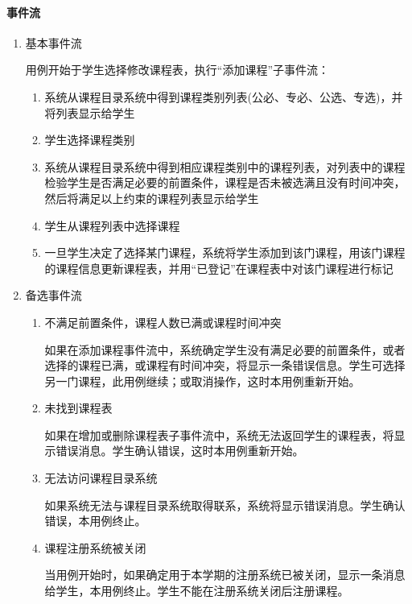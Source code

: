 \paragraph{事件流}
  \begin{enumerate}
    \item 基本事件流
    
    用例开始于学生选择修改课程表，执行“添加课程”子事件流：
    \begin{enumerate}[(1)]
      \item 系统从课程目录系统中得到课程类别列表(公必、专必、公选、专选)，并将列表显示给学生
      \item 学生选择课程类别
      \item 系统从课程目录系统中得到相应课程类别中的课程列表，对列表中的课程检验学生是否满足必要的前置条件，课程是否未被选满且没有时间冲突，然后将满足以上约束的课程列表显示给学生
      \item 学生从课程列表中选择课程
      \item 一旦学生决定了选择某门课程，系统将学生添加到该门课程，用该门课程的课程信息更新课程表，并用“已登记”在课程表中对该门课程进行标记
    \end{enumerate}

    \item 备选事件流
    \begin{enumerate}[(1)]
      \item 不满足前置条件，课程人数已满或课程时间冲突
      
      \CJKindent 如果在添加课程事件流中，系统确定学生没有满足必要的前置条件，或者选择的课程已满，或课程有时间冲突，将显示一条错误信息。学生可选择另一门课程，此用例继续；或取消操作，这时本用例重新开始。
      
      \item 未找到课程表
      
      \CJKindent 如果在增加或删除课程表子事件流中，系统无法返回学生的课程表，将显示错误消息。学生确认错误，这时本用例重新开始。
      
      \item 无法访问课程目录系统
      
      \CJKindent 如果系统无法与课程目录系统取得联系，系统将显示错误消息。学生确认错误，本用例终止。
      
      \item 课程注册系统被关闭
      
      \CJKindent 当用例开始时，如果确定用于本学期的注册系统已被关闭，显示一条消息给学生，本用例终止。学生不能在注册系统关闭后注册课程。
    \end{enumerate}
  \end{enumerate}
  
